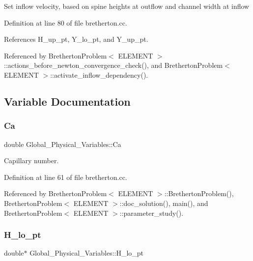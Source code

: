 Set inflow velocity, based on spine heights at outflow and channel width at inflow 

Definition at line 80 of file bretherton.\+cc.



References H\+\_\+up\+\_\+pt, Y\+\_\+lo\+\_\+pt, and Y\+\_\+up\+\_\+pt.



Referenced by Bretherton\+Problem$<$ E\+L\+E\+M\+E\+N\+T $>$\+::actions\+\_\+before\+\_\+newton\+\_\+convergence\+\_\+check(), and Bretherton\+Problem$<$ E\+L\+E\+M\+E\+N\+T $>$\+::activate\+\_\+inflow\+\_\+dependency().



\subsection{Variable Documentation}
\mbox{\label{namespaceGlobal__Physical__Variables_a8b32b93d2e546f9375ec418474107838}} 
\subsubsection{\texorpdfstring{Ca}{Ca}}
{\footnotesize\ttfamily double Global\+\_\+\+Physical\+\_\+\+Variables\+::\+Ca}



Capillary number. 



Definition at line 61 of file bretherton.\+cc.



Referenced by Bretherton\+Problem$<$ E\+L\+E\+M\+E\+N\+T $>$\+::\+Bretherton\+Problem(), Bretherton\+Problem$<$ E\+L\+E\+M\+E\+N\+T $>$\+::doc\+\_\+solution(), main(), and Bretherton\+Problem$<$ E\+L\+E\+M\+E\+N\+T $>$\+::parameter\+\_\+study().

\mbox{\label{namespaceGlobal__Physical__Variables_a137bdac2ad4b72a03ec9916e8ee7395b}} 
\subsubsection{\texorpdfstring{H\+\_\+lo\+\_\+pt}{H\_lo\_pt}}
{\footnotesize\ttfamily double$\ast$ Global\+\_\+\+Physical\+\_\+\+Variables\+::\+H\+\_\+lo\+\_\+pt}



